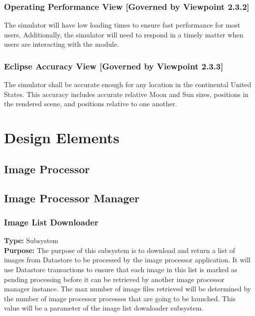 \documentclass[10pt, onecolumn, draftclsnofoot, letterpaper, compsoc]{IEEEtran}
\begin{document}
  \subsubsection{Operating Performance View [Governed by Viewpoint 2.3.2]}
  The simulator will have low loading times to ensure fast
  performance for most users. Additionally, the simulator
  will need to respond in a timely matter when users are
  interacting with the module. \\

  \subsubsection{Eclipse Accuracy View [Governed by Viewpoint 2.3.3]}
  The simulator shall be accurate enough for any location in
  the continental United States. This accuracy includes
  accurate relative Moon and Sun sizes, positions in the
  rendered scene, and positions relative to one another. \\

\section{Design Elements}

\subsection{Image Processor}

\subsection{Image Processor Manager}

    \subsubsection{Image List Downloader}
    \textbf{Type:} Subsystem \\
    \textbf{Purpose:} The purpose of this subsystem is to download and return a list of images from Datastore 
    to be processed by the image processor application. It will use Datastore transactions to ensure that each 
    image in this list is marked as pending processing before it can be retrieved by another image processor 
    manager instance. The max number of image files retrieved will be determined by the number of image 
    processor processes that are going to be launched. This value will be a parameter of the image list 
    downloader subsystem. \\
\end{document}
